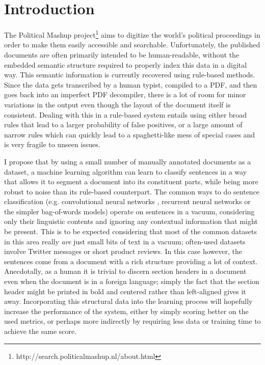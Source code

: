 \section{Introduction}
The Political Mashup
project\footnote{http://search.politicalmashup.nl/about.html} aims to digitize
the world's political proceedings in order to make them easily accessible and
searchable. Unfortunately, the published documents are often primarily intended
to be human-readable, without the embedded semantic structure required to
properly index this data in a digital way. This semantic information is
currently recovered using rule-based methods. Since the data gets transcribed by
a human typist, compiled to a PDF, and then goes back into an imperfect PDF
decompiler, there is a lot of room for minor variations in the output even
though the layout of the document itself is consistent. Dealing with this in a
rule-based system entails using either broad rules that lead to a larger
probability of false positives, or a large amount of narrow rules which can
quickly lead to a spaghetti-like mess of special cases and is very fragile to
unseen issues.

I propose that by using a small number of manually annotated documents as a
dataset, a machine learning algorithm can learn to classify sentences in a way
that allows it to segment a document into its constituent parts, while being
more robust to noise than its rule-based counterpart. The common ways to do
sentence classification (e.g. convolutional neural networks \citep{kim2014conv}
, recurrent neural networks or the simpler bag-of-words models) operate on
sentences in a vacuum, considering only their linguistic contents and ignoring
any contextual information that might be present. This is to be expected
considering that most of the common datasets in this area really \emph{are} just
small bits of text in a vacuum; often-used datasets involve Twitter messages
or short product reviews. In this case however, the sentences come from a
document with a rich structure providing a lot of context. Anecdotally, as a
human it is trivial to discern section headers in a document even when the
document is in a foreign language; simply the fact that the section header might
be printed in bold and centered rather than left-aligned gives it away.
Incorporating this structural data into the learning process will hopefully
increase the performance of the system, either by simply scoring better on the
used metrics, or perhaps more indirectly by requiring less data or training time
to achieve the same score.

